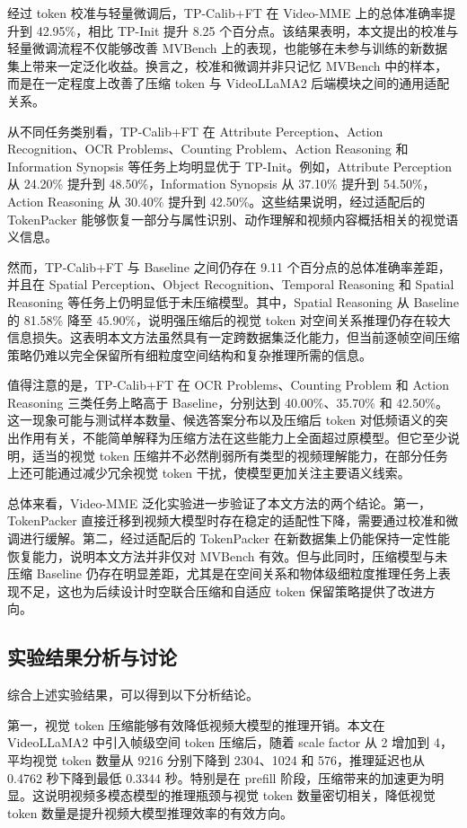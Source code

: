经过 token 校准与轻量微调后，TP-Calib+FT 在 Video-MME 上的总体准确率提升到 42.95\%，相比 TP-Init 提升 8.25 个百分点。该结果表明，本文提出的校准与轻量微调流程不仅能够改善 MVBench 上的表现，也能够在未参与训练的新数据集上带来一定泛化收益。换言之，校准和微调并非只记忆 MVBench 中的样本，而是在一定程度上改善了压缩 token 与 VideoLLaMA2 后端模块之间的通用适配关系。

从不同任务类别看，TP-Calib+FT 在 Attribute Perception、Action Recognition、OCR Problems、Counting Problem、Action Reasoning 和 Information Synopsis 等任务上均明显优于 TP-Init。例如，Attribute Perception 从 24.20\% 提升到 48.50\%，Information Synopsis 从 37.10\% 提升到 54.50\%，Action Reasoning 从 30.40\% 提升到 42.50\%。这些结果说明，经过适配后的 TokenPacker 能够恢复一部分与属性识别、动作理解和视频内容概括相关的视觉语义信息。

然而，TP-Calib+FT 与 Baseline 之间仍存在 9.11 个百分点的总体准确率差距，并且在 Spatial Perception、Object Recognition、Temporal Reasoning 和 Spatial Reasoning 等任务上仍明显低于未压缩模型。其中，Spatial Reasoning 从 Baseline 的 81.58\% 降至 45.90\%，说明强压缩后的视觉 token 对空间关系推理仍存在较大信息损失。这表明本文方法虽然具有一定跨数据集泛化能力，但当前逐帧空间压缩策略仍难以完全保留所有细粒度空间结构和复杂推理所需的信息。

值得注意的是，TP-Calib+FT 在 OCR Problems、Counting Problem 和 Action Reasoning 三类任务上略高于 Baseline，分别达到 40.00\%、35.70\% 和 42.50\%。这一现象可能与测试样本数量、候选答案分布以及压缩后 token 对低频语义的突出作用有关，不能简单解释为压缩方法在这些能力上全面超过原模型。但它至少说明，适当的视觉 token 压缩并不必然削弱所有类型的视频理解能力，在部分任务上还可能通过减少冗余视觉 token 干扰，使模型更加关注主要语义线索。

总体来看，Video-MME 泛化实验进一步验证了本文方法的两个结论。第一，TokenPacker 直接迁移到视频大模型时存在稳定的适配性下降，需要通过校准和微调进行缓解。第二，经过适配后的 TokenPacker 在新数据集上仍能保持一定性能恢复能力，说明本文方法并非仅对 MVBench 有效。但与此同时，压缩模型与未压缩 Baseline 仍存在明显差距，尤其是在空间关系和物体级细粒度推理任务上表现不足，这也为后续设计时空联合压缩和自适应 token 保留策略提供了改进方向。

\subsection{实验结果分析与讨论}

综合上述实验结果，可以得到以下分析结论。

第一，视觉 token 压缩能够有效降低视频大模型的推理开销。本文在 VideoLLaMA2 中引入帧级空间 token 压缩后，随着 scale factor 从 2 增加到 4，平均视觉 token 数量从 9216 分别下降到 2304、1024 和 576，推理延迟也从 0.4762 秒下降到最低 0.3344 秒。特别是在 prefill 阶段，压缩带来的加速更为明显。这说明视频多模态模型的推理瓶颈与视觉 token 数量密切相关，降低视觉 token 数量是提升视频大模型推理效率的有效方向。

